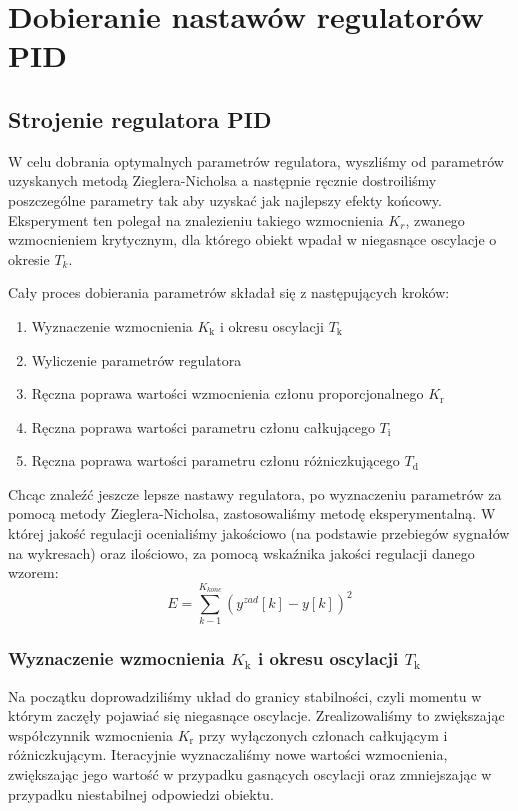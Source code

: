 \chapter{Dobieranie nastawów regulatorów PID}
\label{zad5}

\section{Strojenie regulatora PID}
\label{zad5_PID_wykresy}
W celu dobrania optymalnych parametrów regulatora, wyszliśmy od parametrów uzyskanych metodą
Zieglera-Nicholsa a następnie ręcznie dostroiliśmy poszczególne parametry tak aby uzyskać
jak najlepszy efekty końcowy. Eksperyment ten polegał na znalezieniu takiego wzmocnienia $K_{r}$, 
zwanego wzmocnieniem krytycznym, dla którego obiekt wpadał w niegasnące oscylacje o okresie $T_{k}$. 

Cały proces dobierania parametrów składał się z następujących kroków:
\begin{center}
\begin{enumerate}
    \item Wyznaczenie wzmocnienia $K_{\mathrm{k}}$ i okresu oscylacji $T_{\mathrm{k}}$
    \item Wyliczenie parametrów regulatora
    \item Ręczna poprawa wartości wzmocnienia członu proporcjonalnego $K_{\mathrm{r}}$
    \item Ręczna poprawa wartości parametru członu całkującego $T_{\mathrm{i}}$
    \item Ręczna poprawa wartości parametru członu różniczkującego $T_{\mathrm{d}}$
\end{enumerate}
\end{center}

Chcąc znaleźć jeszcze lepsze nastawy regulatora, po wyznaczeniu parametrów za pomocą metody Zieglera-Nicholsa, zastosowaliśmy metodę eksperymentalną. W której jakość regulacji ocenialiśmy jakościowo (na podstawie przebiegów sygnałów na wykresach) oraz ilościowo, za pomocą wskaźnika jakości regulacji danego wzorem:
\begin{equation}
E=\sum_{k-1}^{K_{konc}}(y^{zad}[k]-y[k])^{2}
\end{equation}
\subsection{Wyznaczenie wzmocnienia $K_{\mathrm{k}}$ i okresu oscylacji $T_{\mathrm{k}}$}
Na początku doprowadziliśmy układ do granicy stabilności, czyli momentu
w którym zaczęły pojawiać się niegasnące oscylacje. Zrealizowaliśmy to
zwiększając współczynnik wzmocnienia $K_{\mathrm{r}}$ przy wyłączonych członach 
całkującym i różniczkującym. Iteracyjnie wyznaczaliśmy nowe wartości wzmocnienia,
zwiększając jego wartość w przypadku gasnących oscylacji oraz zmniejszając w przypadku
niestabilnej odpowiedzi obiektu.

